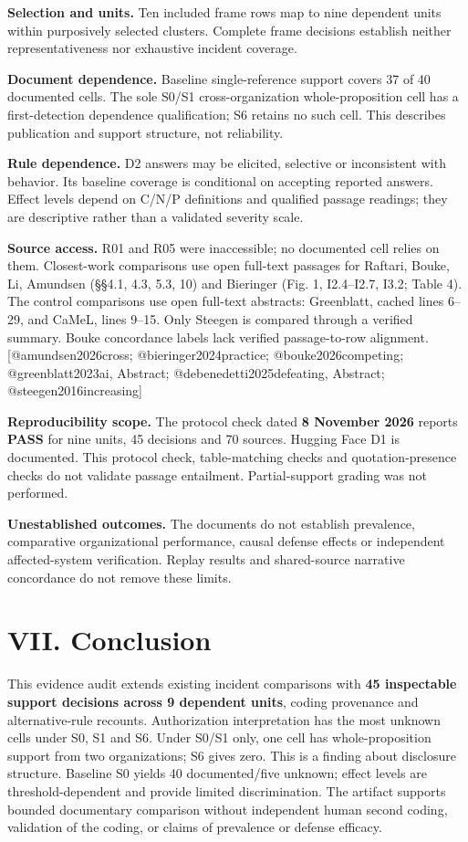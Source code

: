 \documentclass[conference]{IEEEtran}
\begin{document}
\textbf{Selection and units.} Ten included frame rows map to nine dependent units within purposively selected clusters. Complete frame decisions establish neither representativeness nor exhaustive incident coverage.

\textbf{Document dependence.} Baseline single-reference support covers 37 of 40 documented cells. The sole S0/S1 cross-organization whole-proposition cell has a first-detection dependence qualification; S6 retains no such cell. This describes publication and support structure, not reliability.

\textbf{Rule dependence.} D2 answers may be elicited, selective or inconsistent with behavior. Its baseline coverage is conditional on accepting reported answers. Effect levels depend on C/N/P definitions and qualified passage readings; they are descriptive rather than a validated severity scale.

\textbf{Source access.} R01 and R05 were inaccessible; no documented cell relies on them. Closest-work comparisons use open full-text passages for Raftari, Bouke, Li, Amundsen (§§4.1, 4.3, 5.3, 10) and Bieringer (Fig. 1, I2.4--I2.7, I3.2; Table 4). The control comparisons use open full-text abstracts: Greenblatt, cached lines 6--29, and CaMeL, lines 9--15. Only Steegen is compared through a verified summary. Bouke concordance labels lack verified passage-to-row alignment. [@amundsen2026cross; @bieringer2024practice; @bouke2026competing; @greenblatt2023ai, Abstract; @debenedetti2025defeating, Abstract; @steegen2016increasing]

\textbf{Reproducibility scope.} The protocol check dated \textbf{8 November 2026} reports \textbf{PASS} for nine units, 45 decisions and 70 sources. Hugging Face D1 is documented. This protocol check, table-matching checks and quotation-presence checks do not validate passage entailment. Partial-support grading was not performed.

\textbf{Unestablished outcomes.} The documents do not establish prevalence, comparative organizational performance, causal defense effects or independent affected-system verification. Replay results and shared-source narrative concordance do not remove these limits.

\section{VII. Conclusion}

This evidence audit extends existing incident comparisons with \textbf{45 inspectable support decisions across 9 dependent units}, coding provenance and alternative-rule recounts. Authorization interpretation has the most unknown cells under S0, S1 and S6. Under S0/S1 only, one cell has whole-proposition support from two organizations; S6 gives zero. This is a finding about disclosure structure. Baseline S0 yields 40 documented/five unknown; effect levels are threshold-dependent and provide limited discrimination. The artifact supports bounded documentary comparison without independent human second coding, validation of the coding, or claims of prevalence or defense efficacy.
\end{document}
